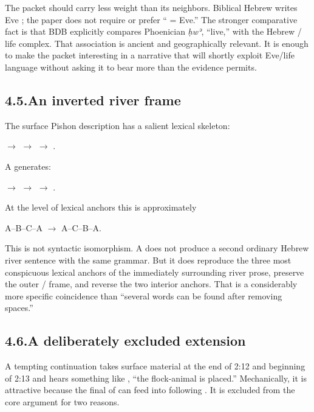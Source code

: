 The packet  should carry less weight than its neighbors.  Biblical Hebrew writes Eve ; the paper does not require or prefer `` = Eve.''  The stronger comparative fact is that BDB explicitly compares Phoenician \textit{ḥwʾ}, ``live,'' with the Hebrew / life complex.\cite{BDB}  That association is ancient and geographically relevant.  It is enough to make the packet interesting in a narrative that will shortly exploit Eve/life language without asking it to bear more than the evidence permits.

\subsection*{4.5.\quad An inverted river frame}

The surface Pishon description has a salient lexical skeleton:

\begin{center}
 \quad $\rightarrow$ \quad {} \quad $\rightarrow$ \quad {} \quad $\rightarrow$ \quad {}.
\end{center}

A generates:

\begin{center}
 \quad $\rightarrow$ \quad {} \quad $\rightarrow$ \quad {} \quad $\rightarrow$ \quad {}.
\end{center}

At the level of lexical anchors this is approximately

\begin{center}
A--B--C--A \qquad $\longrightarrow$ \qquad A--C--B--A.
\end{center}

This is not syntactic isomorphism.  A does not produce a second ordinary Hebrew river sentence with the same grammar.  But it does reproduce the three most conspicuous lexical anchors of the immediately surrounding river prose, preserve the outer / frame, and reverse the two interior anchors.  That is a considerably more specific coincidence than ``several words can be found after removing spaces.''

\subsection*{4.6.\quad A deliberately excluded extension}

A tempting continuation takes surface material at the end of 2:12 and beginning of 2:13 and hears something like , ``the flock-animal is placed.''  Mechanically, it is attractive because the final  of  can feed into following .  It is excluded from the core argument for two reasons.

